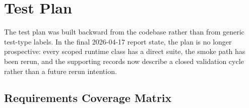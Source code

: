 \chapter{Test Plan}

The test plan was built backward from the codebase rather than from generic test-type labels. In the final 2026-04-17 report state, the plan is no longer prospective: every scoped runtime class has a direct suite, the smoke path has been rerun, and the supporting records now describe a closed validation cycle rather than a future rerun intention.

\section{Requirements Coverage Matrix}

\setlength{\tabcolsep}{3pt}
\footnotesize
